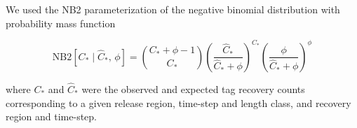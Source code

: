 \documentclass{article}
\begin{document}



We used the NB2 parameterization of the negative binomial distribution with probability mass function

\begin{equation}
  \label{eq:sampling}
  \mathrm{NB2} \! \left[ C_* \mid \widehat{C}_*,\, \phi \right] = \binom{C_* + \phi - 1}{C_*} \left(\frac{\widehat{C}_*}{\widehat{C}_* + \phi}\right)^{C_*} \left( \frac{\phi}{\widehat{C}_* + \phi} \right)^{\phi}
\end{equation}

\noindent where $C_*$ and $\widehat{C}_*$ were the observed and expected tag recovery counts corresponding to a given release region, time-step and length class, and recovery region and time-step.
\end{document}
